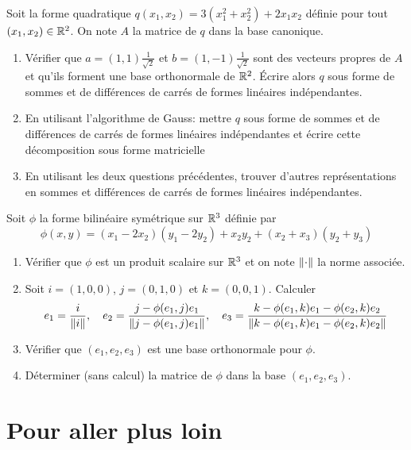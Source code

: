 \documentclass{tp_um}
\begin{document}
\newpage

Soit la forme quadratique $q(x_1,x_2) = 3(x_1^2 + x_2^2) + 2 x_1 x_2$ définie pour tout $(x_1,x_2)\in\mathbb{R}^2$. On note $A$ la matrice de $q$ dans la base canonique.
\begin{enumerate}
	\item Vérifier que $a = (1,1)\frac{1}{\sqrt{2}} $ et $b = (1,-1)\frac{1}{\sqrt{2}}$ sont des vecteurs propres de $A$ et qu'ils forment une base orthonormale de $\mathbb{R}^2$. Écrire alors $q$ sous forme de sommes et de différences de carrés de formes linéaires indépendantes.
	\item En utilisant l'algorithme de Gauss: mettre $q$ sous forme de sommes et de différences de carrés de formes linéaires indépendantes et écrire cette décomposition sous forme matricielle
	\item En utilisant les deux questions précédentes, trouver d'autres représentations en sommes et différences de carrés de formes linéaires indépendantes.
\end{enumerate}



\newpage


\exo[*]{} Soit $\phi$ la forme bilinéaire symétrique sur $\mathbb{R}^3$ définie par
\[
	\phi(x,y) = (x_1 - 2x_2)(y_1-2y_2) + x_2y_2 + (x_2+x_3)(y_2 + y_3)
\]
\begin{enumerate}
	\item Vérifier que $\phi$ est un produit scalaire sur $\mathbb{R}^3$ et on note $\left\lVert\cdot\right\rVert$ la norme associée.
	\item Soit $i=(1,0,0)$, $j=(0,1,0)$ et $k =(0,0,1)$. Calculer 
		$$
		e_1 = \frac{i}{\left\lVert i\right\rVert}, \quad  e_2 = \frac{j - \phi(e_1,j)e_1}{\lVert j - \phi(e_1,j)e_1\rVert}, \quad  e_3 = \frac{k - \phi(e_1,k)e_1 - \phi(e_2,k)e_2}{\left\lVert k - \phi(e_1,k)e_1 - \phi(e_2,k)e_2\right\rVert}
		$$
	\item Vérifier que $(e_1,e_2,e_3)$ est une base orthonormale pour $\phi$.
	\item Déterminer (sans calcul) la matrice de $\phi$ dans la base $(e_1,e_2,e_3)$.
\end{enumerate}

\newpage
\section{Pour aller plus loin}
\end{document}
